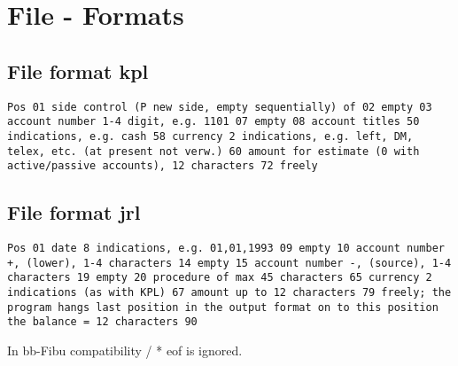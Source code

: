 \chapter{File - Formats}

\section{ File format kpl}

 {\tt  Pos 01 side control (P new side, empty sequentially) of 02 empty 03
account number 1-4 digit, e.g. 1101 07 empty 08 account titles 50 indications,
e.g. cash 58 currency 2 indications, e.g. left, DM, telex, etc. (at present not
verw.)  60 amount for estimate (0 with active/passive accounts), 12 characters
72 freely }



\section{ File format jrl}

 {\tt  Pos 01 date 8 indications, e.g. 01,01,1993 09 empty 10 account number
+, (lower), 1-4 characters 14 empty 15 account number -, (source), 1-4
characters 19 empty 20 procedure of max 45 characters 65 currency 2 indications
(as with KPL) 67 amount up to 12 characters 79 freely;  the program hangs last
position in the output format on to this position the balance = 12 characters
90 }

 In bb-Fibu compatibility / * eof is ignored.

 
